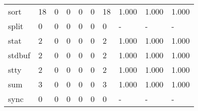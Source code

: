 \begin{longtable}{lp{1.3cm}p{1.3cm}p{1.3cm}p{1.3cm}p{1.3cm}p{1.3cm}p{1.3cm}p{1.3cm}p{1.3cm}}
sort      &                     18 &                                             0 &                                            0 &                                           0 &                                            0 &                                         18 &                                1.000 &                                  1.000 &                                1.000 \\
split     &                      0 &                                             0 &                                            0 &                                           0 &                                            0 &                                          0 &                                    - &                                      - &                                    - \\
stat      &                      2 &                                             0 &                                            0 &                                           0 &                                            0 &                                          2 &                                1.000 &                                  1.000 &                                1.000 \\
stdbuf    &                      2 &                                             0 &                                            0 &                                           0 &                                            0 &                                          2 &                                1.000 &                                  1.000 &                                1.000 \\
stty      &                      2 &                                             0 &                                            0 &                                           0 &                                            0 &                                          2 &                                1.000 &                                  1.000 &                                1.000 \\
sum       &                      3 &                                             0 &                                            0 &                                           0 &                                            0 &                                          3 &                                1.000 &                                  1.000 &                                1.000 \\
sync      &                      0 &                                             0 &                                            0 &                                           0 &                                            0 &                                          0 &                                    - &                                      - &                                    - \\

\end{longtable}
